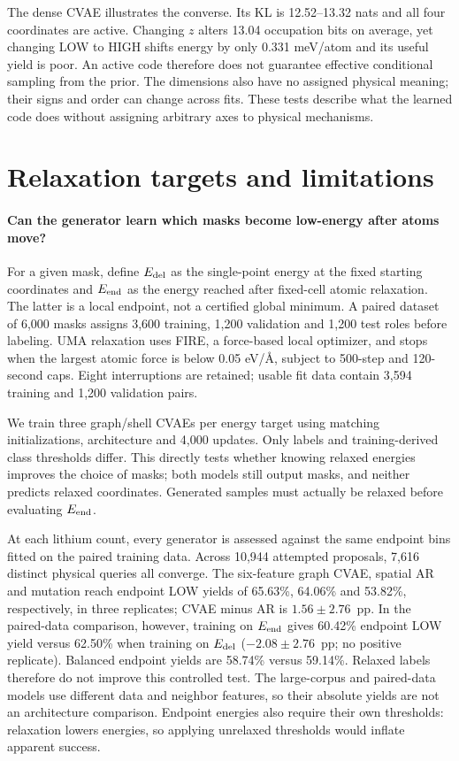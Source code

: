 \documentclass{article}
\begin{document}
The dense CVAE illustrates the converse. Its KL is 12.52--13.32 nats and all
four coordinates are active. Changing $z$ alters 13.04 occupation bits on average,
yet changing LOW to HIGH shifts energy by only 0.331 meV/atom and its useful
yield is poor. An active code therefore does not guarantee effective conditional
sampling from the prior. The dimensions also have no assigned physical meaning;
their signs and order can change across fits. These tests describe what the
learned code does without assigning arbitrary axes to physical mechanisms.

\section{Relaxation targets and limitations}
\paragraph{Can the generator learn which masks become low-energy after atoms move?}
For a given mask, define $E_{\rm del}$ as the single-point energy at the fixed
starting coordinates and $E_{\rm end}$ as the energy reached after fixed-cell
atomic relaxation. The latter is a local endpoint, not a certified global
minimum. A paired dataset of 6,000 masks assigns 3,600 training, 1,200 validation
and 1,200 test roles before labeling. UMA relaxation uses FIRE, a force-based local optimizer,
and stops when the largest atomic force is below 0.05 eV/\AA, subject to
500-step and 120-second caps.
Eight interruptions are retained; usable fit data contain 3,594 training and
1,200 validation pairs.

We train three graph/shell CVAEs per energy target using matching initializations,
architecture and 4,000 updates. Only labels and training-derived class thresholds
differ. This directly tests whether knowing relaxed energies improves the choice
of masks; both models still output masks, and neither predicts relaxed coordinates.
Generated samples must actually be relaxed before evaluating $E_{\rm end}$.

At each lithium count, every generator is assessed against the same endpoint
bins fitted on the paired training data. Across 10,944 attempted proposals,
7,616 distinct physical queries all converge.
The six-feature graph CVAE, spatial AR and mutation reach endpoint LOW yields
of 65.63\%, 64.06\% and 53.82\%, respectively, in three replicates; CVAE minus
AR is $1.56\pm2.76$~pp. In the paired-data comparison, however, training on
$E_{\rm end}$ gives 60.42\% endpoint LOW yield versus 62.50\% when training on
$E_{\rm del}$ ($-2.08\pm2.76$~pp; no positive replicate). Balanced endpoint
yields are 58.74\% versus 59.14\%. Relaxed labels therefore do not improve this
controlled test. The large-corpus and paired-data models use different data and
neighbor features, so their absolute yields are not an architecture comparison.
Endpoint energies also require their own thresholds: relaxation lowers energies,
so applying unrelaxed thresholds would inflate apparent success.
\end{document}

